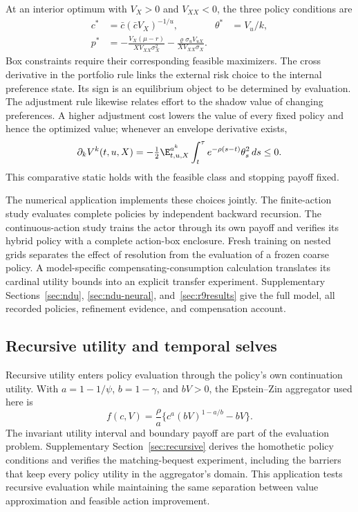 At an interior optimum with $V_X>0$ and $V_{XX}<0$, the three policy conditions are
\begin{align}
 c^*&=\bar c(\bar c V_X)^{-1/u}, &
 \theta^*&=V_u/k,\nonumber\\
 p^*&=-\frac{V_X(\mu-r)}{XV_{XX}\sigma_X^2}
       -\frac{\varrho\sigma_u V_{uX}}{XV_{XX}\sigma_X}.\label{eq:scope-preference-policies}
\end{align}
Box constraints require their corresponding feasible maximizers. The cross derivative in the portfolio rule links the external risk choice to the internal preference state. Its sign is an equilibrium object to be determined by evaluation. The adjustment rule likewise relates effort to the shadow value of changing preferences. A higher adjustment cost lowers the value of every fixed policy and hence the optimized value; whenever an envelope derivative exists,
\begin{equation}\label{eq:scope-preference-envelope}
 \partial_k V^k(t,u,X)
 =-\tfrac12\E^{a^k}_{t,u,X}
   \int_t^\tau e^{-\rho(s-t)}\theta_s^2\,ds\leq0.
\end{equation}
This comparative static holds with the feasible class and stopping payoff fixed.

The numerical application implements these choices jointly. The finite-action study evaluates complete policies by independent backward recursion. The continuous-action study trains the actor through its own payoff and verifies its hybrid policy with a complete action-box enclosure. Fresh training on nested grids separates the effect of resolution from the evaluation of a frozen coarse policy. A model-specific compensating-consumption calculation translates its cardinal utility bounds into an explicit transfer experiment. Supplementary Sections~\ref{sec:ndu}, \ref{sec:ndu-neural}, and~\ref{sec:r9results} give the full model, all recorded policies, refinement evidence, and compensation account.

\subsection{Recursive utility and temporal selves}
Recursive utility enters policy evaluation through the policy's own continuation utility. With $a=1-1/\psi$, $b=1-\gamma$, and $bV>0$, the Epstein--Zin aggregator used here is
\begin{equation}\label{eq:scope-recursive}
 f(c,V)=\frac\rho a\{c^a(bV)^{1-a/b}-bV\}.
\end{equation}
The invariant utility interval and boundary payoff are part of the evaluation problem. Supplementary Section~\ref{sec:recursive} derives the homothetic policy conditions and verifies the matching-bequest experiment, including the barriers that keep every policy utility in the aggregator's domain. This application tests recursive evaluation while maintaining the same separation between value approximation and feasible action improvement.

